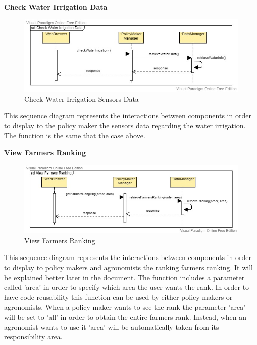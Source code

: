 \documentclass[table, 12pt]{article}
\begin{document}
\newpage
\textbf{Check Water Irrigation Data} 
\begin{center}
    \begin{figure}[H]
        \includegraphics[scale=0.6, center]{assets/SequenceDiagram/Irrigation.jpg}
        \caption{Check Water Irrigation Sensors Data}
        \label{fig: irrigation}
    \end{figure}
\end{center}
This sequence diagram represents the interactions between components in order to display to the policy maker the sensors data regarding the water irrigation.
The function is the same that the case above.

\newpage
\textbf{View Farmers Ranking}
\begin{center}
    \begin{figure}[H]
        \includegraphics[scale=0.6, center]{assets/SequenceDiagram/Ranking.jpg}
        \caption{View Farmers Ranking}
        \label{fig: ranking}
    \end{figure}
\end{center}
This sequence diagram represents the interactions between components in order to display to policy makers and agronomists the ranking farmers ranking.
It will be explained better later in the document.
The function includes a parameter called 'area' in order to specify which area the user wants the rank.
In order to have code reusability this function can be used by either policy makers or agronomists. 
When a policy maker wants to see the rank the parameter 'area' will be set to 'all' in order to obtain the entire farmers rank.
Instead, when an agronomist wants to use it 'area' will be automatically taken from its responsibility area.  
\end{document}
